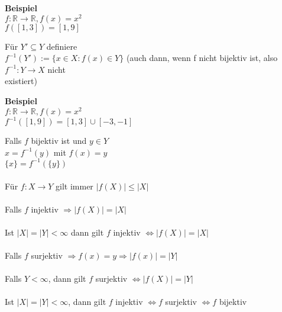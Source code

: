 \documentclass{article}
\begin{document}
	\begin{tcolorbox}[width=\linewidth, sharp corners=all, colback=white!95!black]
	\textbf{Beispiel}\\
	\tabto{2cm} $f: \mathbb{R} \to \mathbb{R} , f(x) = x^2$\\
	\tabto{2cm} $f([1, 3]) = [1, 9]$
	\end{tcolorbox}
	Für $Y' \subseteq Y$ definiere \\
	\tabto{2cm} $f^{-1}(Y'):= \{x \in X: f(x) \in Y\}$
	\tabto{2cm} (auch dann, wenn f nicht bijektiv ist, also $f^{-1}: Y \to X$ nicht\\
	\tabto{2cm} existiert)	
	\begin{tcolorbox}[width=\linewidth, sharp corners=all, colback=white!95!black]
	\textbf{Beispiel}\\
	\tabto{2cm} $f: \mathbb{R} \to \mathbb{R}, f(x) = x^2$ \\
	\tabto{2cm} $f^{-1}([1, 9]) = [1, 3] \cup [-3, -1]$
	\end{tcolorbox}
	Falls $f$ bijektiv ist und $y \in Y$\\
	\tabto{2cm} $x = f^{-1}(y)$ mit $f(x)=y$\\
	\tabto{2cm} $\{x\} = f^{-1}(\{y\})$\\\\
	Für $f: X \to Y$ gilt immer $|f(X) | \leq |X |$  \\\\
	Falls $f$ injektiv $\Rightarrow | f(X) | = |X|$ \\\\
	Ist $| X | = |Y| < \infty$ dann gilt $f$ injektiv $\Leftrightarrow | f(X) | = |X|$\\\\
	Falls $f$ surjektiv $\Rightarrow f(x) = y \Rightarrow |f(x)| = |Y|$\\\\
	Falls $Y < \infty$, dann gilt $f$ surjektiv $\Leftrightarrow |f(X)| = |Y|$\\\\
	Ist $|X| = |Y| < \infty$, dann gilt $f$ injektiv $\Leftrightarrow f$ surjektiv $\Leftrightarrow f$ bijektiv
	
\end{document}
